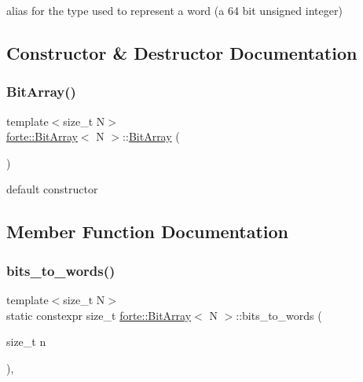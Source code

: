 alias for the type used to represent a word (a 64 bit unsigned integer) 



\subsection{Constructor \& Destructor Documentation}
\mbox{\label{classforte_1_1_bit_array_a3cdd02168872c1fc32ca3999207e3b38}} 
\subsubsection{\texorpdfstring{Bit\+Array()}{BitArray()}}
{\footnotesize\ttfamily template$<$size\+\_\+t N$>$ \\
\mbox{\hyperlink{classforte_1_1_bit_array}{forte\+::\+Bit\+Array}}$<$ N $>$\+::\mbox{\hyperlink{classforte_1_1_bit_array}{Bit\+Array}} (\begin{DoxyParamCaption}{ }\end{DoxyParamCaption})\hspace{0.3cm}{\ttfamily [inline]}}



default constructor 



\subsection{Member Function Documentation}
\mbox{\label{classforte_1_1_bit_array_a95b9ef6120acba58b0131afb94538411}} 
\subsubsection{\texorpdfstring{bits\+\_\+to\+\_\+words()}{bits\_to\_words()}}
{\footnotesize\ttfamily template$<$size\+\_\+t N$>$ \\
static constexpr size\+\_\+t \mbox{\hyperlink{classforte_1_1_bit_array}{forte\+::\+Bit\+Array}}$<$ N $>$\+::bits\+\_\+to\+\_\+words (\begin{DoxyParamCaption}\item[{size\+\_\+t}]{n }\end{DoxyParamCaption})\hspace{0.3cm}{\ttfamily [inline]}, {\ttfamily [static]}}



